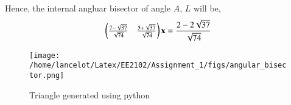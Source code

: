 \documentclass[journal,12pt,twocolumn]{IEEEtran}
\theoremstyle{remark}
\begin{document}
	Hence, the internal angluar bisector of angle $A$, $L$ will be,
	\begin{align}
		\begin{pmatrix}\frac{7-\sqrt{37}}{\sqrt{74}}&\frac{5+\sqrt{37}}{\sqrt{74}}\end{pmatrix} \mathbf{x}=\frac{2-2\sqrt{37}}{\sqrt{74}}
		\label{eq:1.5.1}
	\end{align}
	\begin{figure}
	\centering
	\texttt{[image: /home/lancelot/Latex/EE2102/Assignment\_1/figs/angular\_bisector.png]}
	\caption{Triangle generated using python}
	\label{fig:angular_bisector}
	\end{figure}
\end{document}
